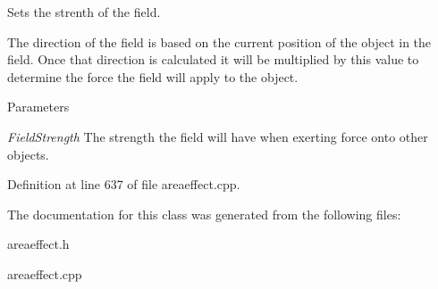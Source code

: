 Sets the strenth of the field. 

The direction of the field is based on the current position of the object in the field. Once that direction is calculated it will be multiplied by this value to determine the force the field will apply to the object. 
\begin{DoxyParams}{Parameters}
\item[{\em FieldStrength}]The strength the field will have when exerting force onto other objects. \end{DoxyParams}


Definition at line 637 of file areaeffect.cpp.



The documentation for this class was generated from the following files:\begin{DoxyCompactItemize}
\item 
areaeffect.h\item 
areaeffect.cpp\end{DoxyCompactItemize}
